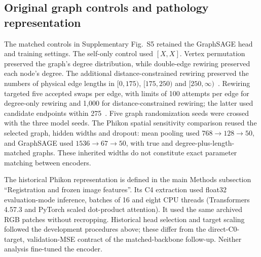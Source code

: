 \subsection{Original graph controls and pathology representation}
The matched controls in Supplementary Fig.~S5 retained the GraphSAGE head and training settings. The self-only control used $[X,X]$. Vertex permutation preserved the graph's degree distribution, while double-edge rewiring preserved each node's degree. The additional distance-constrained rewiring preserved the numbers of physical edge lengths in $[0,175)$, $[175,250)$ and $[250,\infty)$~\um{}. Rewiring targeted five accepted swaps per edge, with limits of 100 attempts per edge for degree-only rewiring and 1,000 for distance-constrained rewiring; the latter used candidate endpoints within 275~\um{}. Five graph randomization seeds were crossed with the three model seeds. The Phikon spatial sensitivity comparison reused the selected graph, hidden widths and dropout: mean pooling used $768\rightarrow128\rightarrow50$, and GraphSAGE used $1536\rightarrow67\rightarrow50$, with true and degree-plus-length-matched graphs. These inherited widths do not constitute exact parameter matching between encoders.

The historical Phikon representation is defined in the main Methods subsection ``Registration and frozen image features''. Its C4 extraction used float32 evaluation-mode inference, batches of 16 and eight CPU threads (Transformers 4.57.3 and PyTorch scaled dot-product attention). It used the same archived RGB patches without recropping. Historical head selection and target scaling followed the development procedures above; these differ from the direct-C0-target, validation-MSE contract of the matched-backbone follow-up. Neither analysis fine-tuned the encoder.

